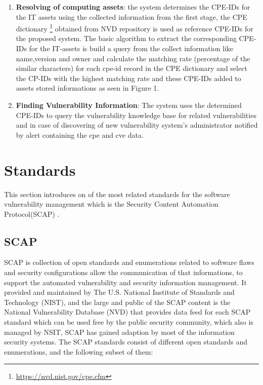 \documentclass{llncs}
\begin{document}
\begin{enumerate}
   \item \textbf{Resolving of computing assets}: the system determines the CPE-IDs for the IT assets using the collected information from the first stage, the CPE dictionary \footnote{\url{https://nvd.nist.gov/cpe.cfm}} obtained from NVD repository is used as reference CPE-IDs for the proposed system. The basic algorithm to extract the corresponding CPE-IDs for the IT-assets is build a query from the collect information like name,version and owner and calculate the matching rate (percentage of the similar characters) for each cpe-id record in the CPE dictionary and select the CP-IDs with the highest matching rate and these CPE-IDs added to assets stored informations as seen in Figure 1.
   
   \item \textbf{Finding Vulnerability Information}: The system uses the determined CPE-IDs to query the vulnerability knowledge base for related vulnerabilities and in case of discovering of new vulnerability system's administrator notified by alert containing the cpe and cve data.      
   
 
 \end{enumerate}



\newpage
\section{Standards}
This section introduces on of the most related standards for the software vulnerability management which is the Security Content Automation Protocol(SCAP) \cite{scap}.


\subsection{SCAP}
 SCAP is collection of open standards and enumerations related to software flaws and security configurations allow the communication of that informations, to support the automated vulnerability and security information management.    
 It provided and maintained by The U.S. National Institute of Standards and Technology (NIST)\cite{nsit}, and the large and public of the SCAP content is the National Vulnerability Database (NVD)\cite{nvd} that provides data feed for each SCAP standard which can be used free by the public security community, which also is managed by NSIT, SCAP has gained adaption by most of the information security systems.  
 The SCAP standards consist of different open standards and enumerations, and the following subset of them:
 
\end{document}
